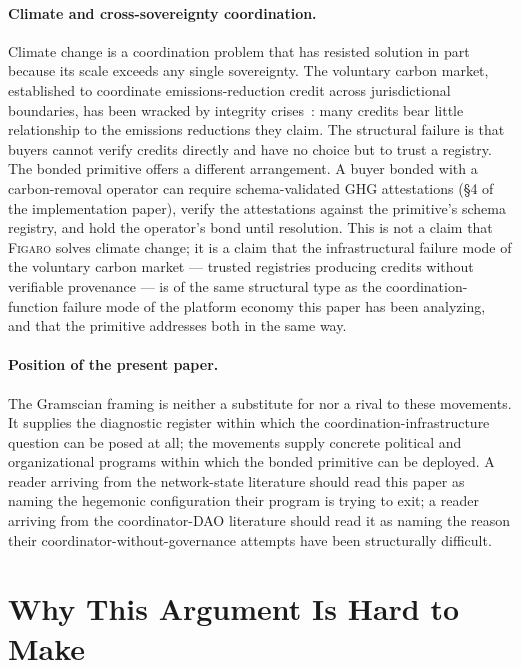 \documentclass[11pt,a4paper]{article}
\theoremstyle{remark}
\newcommand{\figaro}{\textsc{Figaro}}
\begin{document}
\paragraph{Climate and cross-sovereignty coordination.}
Climate change is a coordination problem that has resisted
solution in part because its scale exceeds any single sovereignty.
The voluntary carbon market, established to coordinate
emissions-reduction credit across jurisdictional boundaries, has
been wracked by integrity
crises~\citep{west2020overcrediting}: many credits bear little
relationship to the emissions reductions they claim. The
structural failure is that buyers cannot verify credits directly
and have no choice but to trust a registry. The bonded primitive
offers a different arrangement. A buyer bonded with a
carbon-removal operator can require schema-validated GHG
attestations (§4 of the implementation paper), verify the attestations
against the primitive's schema registry, and hold the operator's
bond until resolution. This is not a claim that \figaro{} solves
climate change; it is a claim that the infrastructural failure
mode of the voluntary carbon market --- trusted registries
producing credits without verifiable provenance --- is of the same
structural type as the coordination-function failure mode of the
platform economy this paper has been analyzing, and that the
primitive addresses both in the same way.

\paragraph{Position of the present paper.}
The Gramscian framing is neither a substitute for nor a rival to
these movements. It supplies the diagnostic register within which
the coordination-infrastructure question can be posed at all; the
movements supply concrete political and organizational programs
within which the bonded primitive can be deployed. A reader
arriving from the network-state literature should read this paper
as naming the hegemonic configuration their program is trying to
exit; a reader arriving from the coordinator-DAO literature should
read it as naming the reason their coordinator-without-governance
attempts have been structurally difficult.

\section{Why This Argument Is Hard to Make}
\label{sec:hardness}
\end{document}
